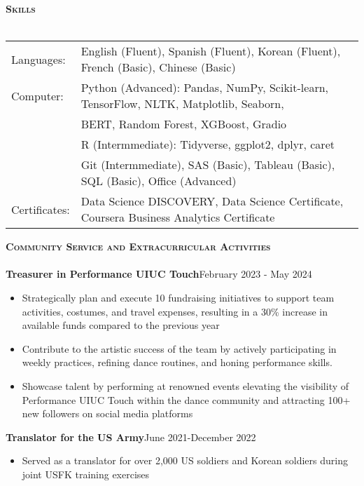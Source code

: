\documentclass[a4paper]{article}
\newcommand{\lineunder} {
    \vspace*{-8pt} \\
    \hspace*{-18pt} \hrulefill \\
}
\newcommand{\header} [1] {
    {\hspace*{-18pt}\vspace*{6pt} \textsc{#1}}
    \vspace*{-6pt} \lineunder
}
\begin{document}
\vspace*{1mm}

\header{\textbf{Skills}}
\begin{tabular}{ l l }
    Languages: & English (Fluent), Spanish (Fluent), Korean (Fluent), French (Basic), Chinese (Basic)              \\
    Computer: & Python (Advanced): Pandas, NumPy, Scikit-learn, TensorFlow, 
    NLTK, Matplotlib, Seaborn, \\
    & BERT, Random Forest, XGBoost, Gradio\\
    & R (Intermmediate): Tidyverse, ggplot2, dplyr, caret\\
    & Git (Intermmediate), SAS (Basic), Tableau (Basic), SQL (Basic), Office (Advanced)\\
    Certificates: & Data Science DISCOVERY, Data Science Certificate, 
    Coursera Business Analytics Certificate
\end{tabular}


\vspace{1mm}


\header{\textbf{Community Service and Extracurricular Activities}}

\textbf{Treasurer in Performance UIUC Touch}\hfill February 2023 - May 2024\\
\begin{itemize}[nolistsep]
    \item Strategically plan and execute 10 fundraising 
    initiatives to support team activities, costumes,
    and travel expenses, resulting in a 30\% 
    increase in available funds compared to the previous year
    \item Contribute to the artistic success of the team by actively participating in 
    weekly practices, refining dance routines, and honing performance skills.
    \item Showcase talent by performing at renowned 
    events elevating the visibility of Performance 
    UIUC Touch within the dance community and attracting 100+ new followers 
    on social media platforms
\end{itemize}
\vspace*{1mm}

{\textbf{Translator for the US Army}\hfill{June 2021-December 2022}}\\
    \begin{itemize}[noitemsep]
        \item Served as a translator for over 2,000 US soldiers 
        and Korean soldiers during joint 
        USFK training exercises
    \end{itemize}
\end{document}
